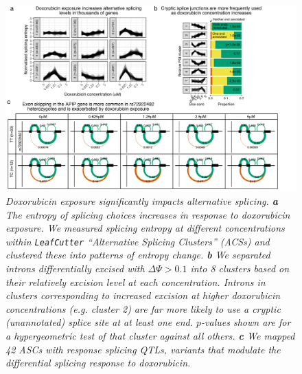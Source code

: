 \documentclass{article}
\begin{document}
{\begin{figure}
\begin{center}
    \includegraphics[width=1\textwidth]{../figures/fig3_splicing.pdf}     \caption{\it{Doxorubicin exposure significantly impacts alternative splicing. \textbf{a} The entropy of splicing choices increases in response to doxorubicin exposure. We measured splicing entropy at different concentrations within \texttt{LeafCutter} ``Alternative Splicing Clusters'' (ACSs) and clustered these into patterns of entropy change. \textbf{b} We separated introns differentially excised with $\Delta \Psi > 0.1$ into 8 clusters based on their relatively excision level at each concentration. Introns in clusters corresponding to increased excision at higher doxorubicin concentrations (e.g. cluster 2) are far more likely to use a cryptic (unannotated) splice site at at least one end. $p$-values shown are for a hypergeometric test of that cluster against all others. \textbf{c} We mapped 42 ASCs with response splicing QTLs, variants that modulate the differential splicing response to doxorubicin.}}
    \label{fig_splicing}
    \end{center}
\end{figure}

}
\end{document}
